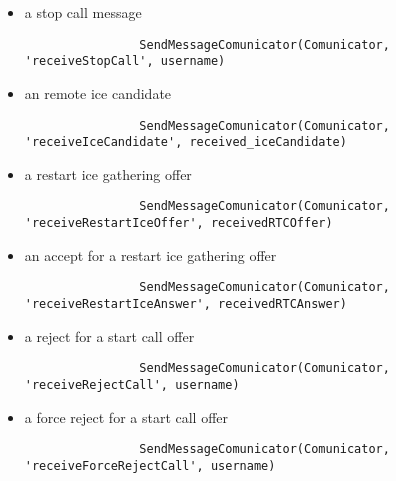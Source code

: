 \begin{itemize}
\begin{itemize}
\begin{lstlisting}
            \end{lstlisting}
            \item a stop call message
            \begin{lstlisting}
                SendMessageComunicator(Comunicator, 'receiveStopCall', username)
            \end{lstlisting}
            \item an remote ice candidate
            \begin{lstlisting}
                SendMessageComunicator(Comunicator, 'receiveIceCandidate', received_iceCandidate)
            \end{lstlisting}
            \item a restart ice gathering offer
            \begin{lstlisting}
                SendMessageComunicator(Comunicator, 'receiveRestartIceOffer', receivedRTCOffer)
            \end{lstlisting}
            \item an accept for a restart ice gathering offer
            \begin{lstlisting}
                SendMessageComunicator(Comunicator, 'receiveRestartIceAnswer', receivedRTCAnswer)
            \end{lstlisting}
            \item a reject for a start call offer
            \begin{lstlisting}
                SendMessageComunicator(Comunicator, 'receiveRejectCall', username)
            \end{lstlisting}
            \item a force reject for a start call offer
            \begin{lstlisting}
                SendMessageComunicator(Comunicator, 'receiveForceRejectCall', username)
            \end{lstlisting}
        \end{itemize}
\end{itemize}

